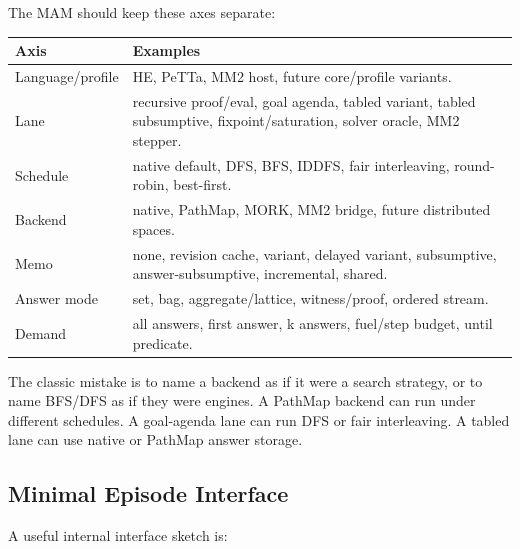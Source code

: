 \documentclass[11pt]{article}
\newcommand{\PeTTa}{PeTTa}
\newcommand{\HE}{HE}
\newcommand{\MAM}{MAM}
\newcommand{\PathMap}{PathMap}
\newcommand{\MORK}{MORK}
\newcommand{\MM}{MM2}
\begin{document}
The \MAM{} should keep these axes separate:

\begin{longtable}{>{\raggedright\arraybackslash}p{} >{\raggedright\arraybackslash}p{}}
\toprule
Axis & Examples \\
\midrule
Language/profile & \HE{}, \PeTTa{}, \MM{} host, future core/profile variants. \\
Lane & recursive proof/eval, goal agenda, tabled variant, tabled subsumptive, fixpoint/saturation, solver oracle, \MM{} stepper. \\
Schedule & native default, DFS, BFS, IDDFS, fair interleaving, round-robin, best-first. \\
Backend & native, \PathMap{}, \MORK{}, \MM{} bridge, future distributed spaces. \\
Memo & none, revision cache, variant, delayed variant, subsumptive, answer-subsumptive, incremental, shared. \\
Answer mode & set, bag, aggregate/lattice, witness/proof, ordered stream. \\
Demand & all answers, first answer, k answers, fuel/step budget, until predicate. \\
\bottomrule
\end{longtable}

The classic mistake is to name a backend as if it were a search strategy, or to name BFS/DFS as if they were engines.  A \PathMap{} backend can run under different schedules.  A goal-agenda lane can run DFS or fair interleaving.  A tabled lane can use native or \PathMap{} answer storage.

\subsection{Minimal Episode Interface}

A useful internal interface sketch is:
\end{document}
